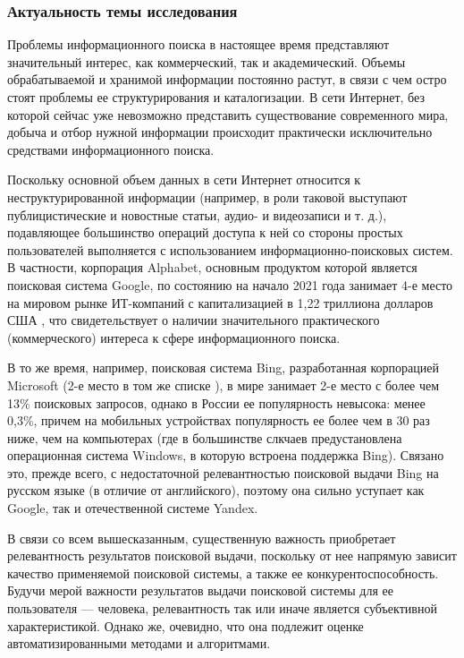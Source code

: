 \subsubsection{Актуальность темы исследования}
Проблемы информационного поиска в настоящее время представляют значительный интерес, как коммерческий, так и академический. Объемы обрабатываемой
и хранимой информации постоянно растут, в связи с чем остро стоят проблемы ее структурирования и каталогизации. В сети Интернет, без которой сейчас
уже невозможно представить существование современного мира, добыча и отбор нужной информации происходит практически исключительно средствами
информационного поиска.

Поскольку основной объем данных в сети Интернет относится к неструктурированной информации (например, в роли таковой выступают
публицистические и новостные статьи, аудио- и видеозаписи и т. д.), подавляющее большинство операций доступа к ней со стороны
простых пользователей выполняется с использованием информационно-поисковых систем. В частности, корпорация Alphabet, основным
продуктом которой является поисковая система Google, по состоянию на начало 2021 года занимает 4-е место на мировом рынке
ИТ-компаний с капитализацией в 1,22 триллиона долларов США \cite{forbestop100it}, что свидетельствует о наличии значительного
практического (коммерческого) интереса к сфере информационного поиска.

В то же время, например, поисковая система Bing, разработанная корпорацией Microsoft (2-е место в том же списке \cite{forbestop100it}),
в мире занимает 2-е место с более чем 13\% поисковых запросов, однако в России ее популярность невысока: менее 0,3\%, причем
на мобильных устройствах популярность ее более чем в 30 раз ниже, чем на компьютерах \cite{drmax2020} (где в большинстве
слкчаев предустановлена операционная система Windows, в которую встроена поддержка Bing). Связано это, прежде всего, с
недостаточной релевантностью поисковой выдачи Bing на русском языке (в отличие от английского), поэтому она сильно уступает
как Google, так и отечественной системе Yandex.

В связи со всем вышесказанным, существенную важность приобретает релевантность результатов поисковой выдачи, поскольку от нее напрямую зависит
качество применяемой поисковой системы, а также ее конкурентоспособность. Будучи мерой важности результатов выдачи поисковой системы для
ее пользователя --- человека, релевантность так или иначе является субъективной характеристикой. Однако же, очевидно, что она подлежит оценке
автоматизированными методами и алгоритмами.

